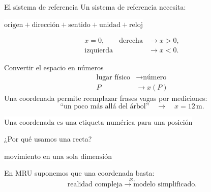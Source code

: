 \documentclass[aspectratio=169,11pt]{beamer}
\newcommand{\caja}[1]{%
  \begin{center}
  \setlength{\fboxsep}{9pt}
  \colorbox{white}{\(\displaystyle \boxed{#1}\)}
  \end{center}
}
\begin{document}
\begin{frame}{El sistema de referencia}
  Un sistema de referencia necesita:
  \caja{\text{origen}+\text{dirección}+\text{sentido}+\text{unidad}+\text{reloj}}
  \begin{align*}
    x=0,\qquad
    \text{derecha}&\longrightarrow x>0,\\
    \text{izquierda}&\longrightarrow x<0.
  \end{align*}
  \begin{center}
  \end{center}
\end{frame}

\begin{frame}{Convertir el espacio en números}
  \begin{align*}
    \text{lugar físico} &\longrightarrow \text{número}\\
    P &\longrightarrow x(P)
  \end{align*}
  \vspace{0.5em}
  Una coordenada permite reemplazar frases vagas por mediciones:
  \[
    \text{``un poco más allá del árbol''}
    \quad\longrightarrow\quad
    x=12\,\mathrm{m}.
  \]
  \caja{\text{Una coordenada es una etiqueta numérica para una posición}}
\end{frame}

\begin{frame}{¿Por qué usamos una recta?}
  \caja{\text{movimiento en una sola dimensión}}
  \vspace{0.5em}
  En MRU suponemos que una coordenada basta:
  \[
    x.
  \]
  \[
    \text{realidad compleja}
    \longrightarrow
    \text{modelo simplificado}.
  \]
  \begin{center}
  \end{center}
\end{frame}
\end{document}
